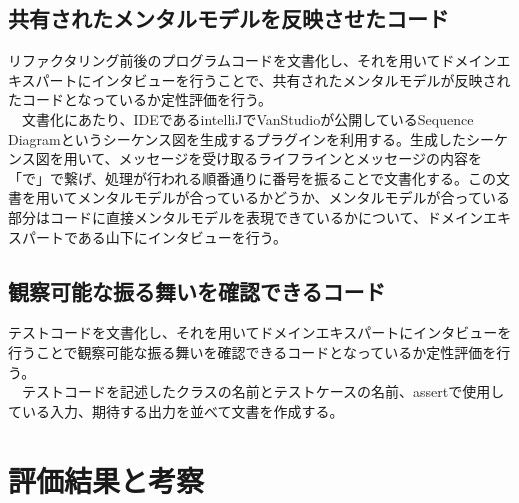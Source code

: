 \documentclass[11pt, a4paper]{jreport}
\begin{document}
\subsection{共有されたメンタルモデルを反映させたコード}
リファクタリング前後のプログラムコードを文書化し、それを用いてドメインエキスパートにインタビューを行うことで、共有されたメンタルモデルが反映されたコードとなっているか定性評価を行う。
\\　文書化にあたり、IDEであるintelliJでVanStudioが公開しているSequence Diagramというシーケンス図を生成するプラグインを利用する。生成したシーケンス図を用いて、メッセージを受け取るライフラインとメッセージの内容を「で」で繋げ、処理が行われる順番通りに番号を振ることで文書化する。この文書を用いてメンタルモデルが合っているかどうか、メンタルモデルが合っている部分はコードに直接メンタルモデルを表現できているかについて、ドメインエキスパートである山下にインタビューを行う。
\subsection{観察可能な振る舞いを確認できるコード}
テストコードを文書化し、それを用いてドメインエキスパートにインタビューを行うことで観察可能な振る舞いを確認できるコードとなっているか定性評価を行う。
\\　テストコードを記述したクラスの名前とテストケースの名前、assertで使用している入力、期待する出力を並べて文書を作成する。
\section{評価結果と考察}
\end{document}
